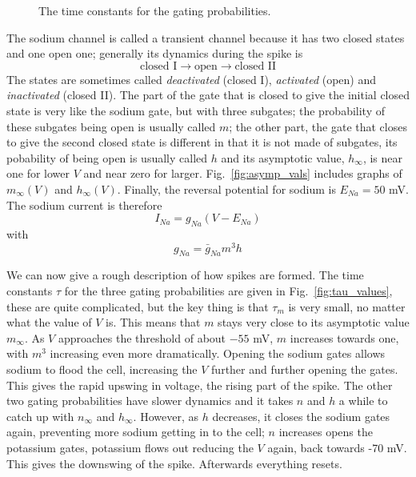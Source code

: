 \documentclass[11pt,a4paper]{scrartcl}
\begin{document}
\begin{figure}
\begin{center}

\end{center}
\caption{The time constants for the gating probabilities.\label{fig:tau_vals}}
\end{figure}


The sodium channel is called a transient channel because it has two
closed states and one open one; generally its dynamics during the
spike is
\begin{equation}
\mbox{closed I}\rightarrow \mbox{open}\rightarrow\mbox{closed II}
\end{equation}
The states are sometimes called \textsl{deactivated} (closed I),
\textsl{activated} (open) and \textsl{inactivated} (closed II).  The
part of the gate that is closed to give the initial closed state is
very like the sodium gate, but with three subgates; the probability of
these subgates being open is usually called $m$; the other part, the
gate that closes to give the second closed state is different in that
it is not made of subgates, its pobability of being open is usually
called $h$ and its asymptotic value, $h_\infty$, is near one for lower
$V$ and near zero for larger. Fig.~\ref{fig:asymp_vals} includes
graphs of $m_\infty(V)$ and $h_\infty(V)$. Finally, the reversal
potential for sodium is $E_{Na}=50$ mV. The sodium current is
therefore
\begin{equation}
I_{Na}=g_{Na}(V-E_{Na})
\end{equation}
with
\begin{equation}
g_{Na}=\bar{g}_{Na}m^3h
\end{equation}

We can now give a rough description of how spikes are formed. The time
constants $\tau$ for the three gating probabilities are given in
Fig.~\ref{fig:tau_values}, these are quite complicated, but the key
thing is that $\tau_m$ is very small, no matter what the value of $V$
is. This means that $m$ stays very close to its asymptotic value
$m_\infty$. As $V$ approaches the threshold of about $-55$ mV, $m$
increases towards one, with $m^3$ increasing even more
dramatically. Opening the sodium gates allows sodium to flood the
cell, increasing the $V$ further and further opening the gates. This
gives the rapid upswing in voltage, the rising part of the spike. The
other two gating probabilities have slower dynamics and it takes $n$
and $h$ a while to catch up with $n_\infty$ and $h_\infty$. However,
as $h$ decreases, it closes the sodium gates again, preventing more
sodium getting in to the cell; $n$ increases opens the potassium
gates, potassium flows out reducing the $V$ again, back towards -70
mV. This gives the downswing of the spike. Afterwards everything
resets.
\end{document}
